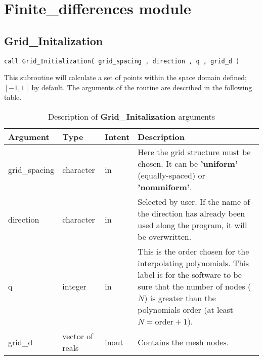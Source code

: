 



\section{Finite\_differences module}


\subsection*{Grid\_Initalization}

\lstset{language=Fortran}
\begin{lstlisting}[frame=trBL]
call Grid_Initialization( grid_spacing , direction , q , grid_d )
\end{lstlisting}

This subroutine will calculate a set of points within the space domain defined; $[-1,1]$ by default. The arguments of the routine are described in the following table.

\begin{table}[H]
	\begin{center}
		\begin{spacing}{1.2}
			\begin{tabular}{| l | l | l | p{6cm} |}
				
				\hline
				
				\bf Argument & \bf Type & \bf Intent & \bf Description \\ \hline \hline
				
				grid\_spacing & character & in &   Here the grid structure must be chosen. It can be \textbf{'uniform'}   (equally-spaced) or \textbf{'nonuniform'}.  \\ \hline
				
				direction &  character  & in & Selected by user. If the name of the direction has already been used along the program, it will be overwritten. \\ \hline
				
				q & integer & in &   This is the order chosen for the interpolating polynomials. This label is for the software to be sure that the number of nodes ($N$) is greater than the polynomials order (at least $ N = \text{order} +1 $).  \\ \hline
				
				grid\_d & vector of reals  & inout &  Contains the mesh nodes.  \\ \hline
				
				
			\end{tabular}
		\end{spacing}
	\end{center}
	\caption{Description of \textbf{Grid\_Initalization} arguments}
\end{table}

